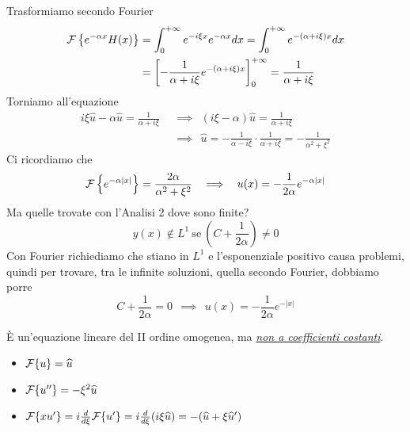 Trasformiamo secondo Fourier
\begin{equation*}
\begin{aligned}
\mathcal{F} \left\{e^{- \alpha x} H(x)\right\} & = \int^{+ \infty}_{0} e^{- i\xi x} e^{- \alpha x} dx = \int^{+ \infty}_{0} e^{- (\alpha + i\xi) x} dx\\
 & = \left[ - \frac{1}{\alpha + i\xi} e^{- (\alpha + i\xi) x}\right]^{+ \infty}_{0} = \frac{1}{\alpha + i\xi}
\end{aligned}
\end{equation*}
Torniamo all'equazione
\begin{equation*}
\begin{aligned}
i\xi \hat{u} - \alpha \hat{u} = \frac{1}{\alpha + i\xi} \ \ & \implies \ \ (i\xi - \alpha)\hat{u} = \frac{1}{\alpha + i\xi}\\
 & \implies \ \ \hat{u} = - \frac{1}{\alpha - i\xi} \cdot \frac{1}{\alpha + i\xi} = - \frac{1}{\alpha^{2} + \xi^{2}}
\end{aligned}
\end{equation*}
Ci ricordiamo che
\begin{equation*}
\mathcal{F} \left\{e^{- \alpha | x|}\right\} = \frac{2\alpha}{\alpha^{2} + \xi^{2}} \ \ \implies \ \ u(x) = - \frac{1}{2\alpha} e^{- \alpha | x|}
\end{equation*}
Ma quelle trovate con l'Analisi 2 dove sono finite?
\begin{equation*}
y(x) \notin L^{1} \ \text{se} \ \left(C + \frac{1}{2\alpha}\right) \neq 0
\end{equation*}
Con Fourier richiediamo che stiano in $L^{1}$ e l'esponenziale positivo causa problemi, quindi per trovare, tra le infinite soluzioni, quella secondo Fourier, dobbiamo porre
\begin{equation*}
C + \frac{1}{2\alpha} = 0\ \ \implies \ \ u(x) = - \frac{1}{2\alpha} e^{- | x|}
\end{equation*}
\Soluzione

È un'equazione lineare del II ordine omogenea, ma \textit{\underline{non a coefficienti costanti}}.
\begin{itemize}
\item $\mathcal{F} \{u\} = \widehat{u}$
\item $\mathcal{F} \{u''\} = - \xi^{2}\widehat{u}$
\item $\mathcal{F} \{xu'\} = i\frac{d}{d\xi}\mathcal{F} \{u'\} = i\frac{d}{d\xi}(i\xi \widehat{u}) = - (\widehat{u} + \xi \widehat{u} ')$
\end{itemize}

